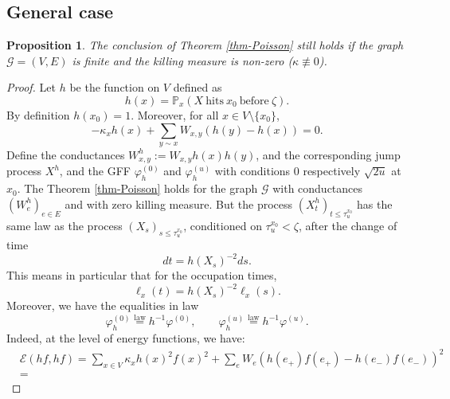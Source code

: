 \documentclass[11pt,a4paper]{amsart}
\numberwithin{equation}{section}
\newtheorem{proposition}{Proposition}[section]
\begin{document}
\subsection{General case}
\label{sec:pgen}

\begin{proposition}
\label{PropKillingCase}
The conclusion of
Theorem \ref{thm-Poisson} still holds
if the graph $\mathcal{G}=(V,E)$ is finite and the killing measure is non-zero ($\kappa\not\equiv 0$).
\end{proposition}

\begin{proof}
Let $h$ be the function on $V$ defined as
\begin{displaymath}
h(x)=\mathbb{P}_{x}(X~\text{hits}~x_{0}~\text{before}~\zeta).
\end{displaymath}
By definition $h(x_{0})=1$. Moreover, for all 
$x\in V\setminus\lbrace x_{0}\rbrace$,
\begin{displaymath}
-\kappa_{x} h(x)+\sum_{y\sim x}W_{x,y}(h(y)-h(x))=0.
\end{displaymath}
Define the conductances
$W^{h}_{x,y}:=W_{x,y}h(x)h(y)$, and the corresponding jump process $X^{h}$, and the GFF $\varphi_{h}^{(0)}$ and $\varphi_{h}^{(u)}$ with conditions
$0$ respectively $\sqrt{2u}$ at $x_{0}$. The Theorem \ref{thm-Poisson}
holds for the graph $\mathcal{G}$ with conductances 
$(W^{h}_{e})_{e\in E}$ and with zero killing measure. But the process
$(X^{h}_{t})_{t\leq \tau_{u}^{x_{0}}}$ has the same law as the process
$(X_{s})_{s\leq \tau_{u}^{x_{0}}}$, conditioned on
$\tau_{u}^{x_{0}}<\zeta$, after the change of time
\begin{displaymath}
dt = h(X_{s})^{-2}ds.
\end{displaymath}
This means in particular that for the occupation times,
\begin{equation}
\label{EqTimeChange}
\ell_{x}(t)=h(X_{s})^{-2}\ell_{x}(s).
\end{equation}
Moreover, we have the equalities in law 
\begin{displaymath}
\varphi_{h}^{(0)}\stackrel{\text{law}}{=}h^{-1}\varphi^{(0)},\qquad
\varphi_{h}^{(u)}\stackrel{\text{law}}{=}h^{-1}\varphi^{(u)}.
\end{displaymath}
Indeed, at the level of energy functions, we have:
\begin{equation*}
\begin{split}
&\mathcal{E}(hf,hf)=
\sum_{x\in V}\kappa_{x} h(x)^{2}f(x)^{2}+
\sum_{e}W_{e}(h(e_{+})f(e_{+})-h(e_{-})f(e_{-}))^{2}\\&=

\end{split}
\end{equation*}
\end{proof}
\end{document}
